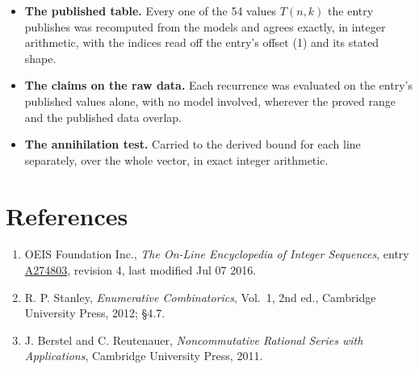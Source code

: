 \documentclass[11pt]{article}
\theoremstyle{definition}
\begin{document}
\begin{itemize}

\item {\bfseries The published table.} Every one of the 54 values $T(n,k)$ the entry publishes was recomputed from the models and agrees exactly, in integer arithmetic, with the indices read off the entry's offset (1) and its stated shape.

\item {\bfseries The claims on the raw data.} Each recurrence was evaluated on the entry's published values alone, with no model involved, wherever the proved range and the published data overlap.

\item {\bfseries The annihilation test.} Carried to the derived bound for each line separately, over the whole vector, in exact integer arithmetic.

\end{itemize}

\section{References}

\begin{enumerate}

\item OEIS Foundation Inc., \emph{The On-Line Encyclopedia of Integer Sequences}, entry \href{https://oeis.org/A274803}{A274803}, revision 4, last modified Jul 07 2016.

\item R. P. Stanley, \emph{Enumerative Combinatorics}, Vol.~1, 2nd ed., Cambridge University Press, 2012; \S4.7.

\item J. Berstel and C. Reutenauer, \emph{Noncommutative Rational Series with Applications}, Cambridge University Press, 2011.

\end{enumerate}
\end{document}
